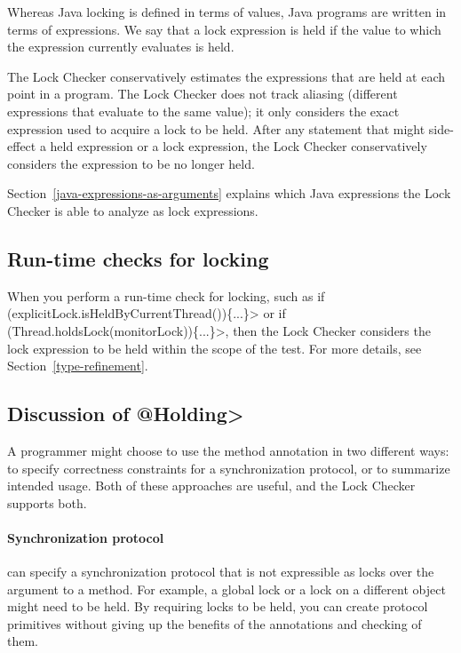 Whereas Java locking is defined in terms of values, Java programs are
written in terms of expressions.
We say that a lock expression is held if the value to which the expression
currently evaluates is held.

The Lock Checker conservatively estimates the expressions that are held at
each point in a program.
The Lock Checker does not track aliasing
(different expressions that evaluate to the same value); it only considers
the exact expression used to acquire a lock to be held.  After any statement
that might side-effect a held expression or a lock expression, the Lock
Checker conservatively considers the expression to be no longer held.

Section~\ref{java-expressions-as-arguments} explains which Java
expressions the Lock Checker is able to analyze as lock expressions.


\subsection{Run-time checks for locking\label{lock-runtime-checks}}

When you perform a run-time check for locking, such as
\<if (explicitLock.isHeldByCurrentThread())\{...\}> or
\<if (Thread.holdsLock(monitorLock))\{...\}>,
then the Lock Checker considers the lock expression to be held
within the scope of the test.  For more details, see
Section~\ref{type-refinement}.


\subsection{Discussion of \<@Holding>\label{lock-checker-holding}}

A programmer might choose to use the  method annotation in
two different ways:  to specify correctness constraints for a synchronization protocol, or to summarize
intended usage.  Both of these approaches are useful, and the Lock Checker
supports both.

\paragraph{Synchronization protocol\label{lock-checker-holding-synchronization-protocol}}

   can specify a synchronization protocol that
  is not expressible as locks over the argument to a method.  For example, a global lock
  or a lock on a different object might need to be held.  By requiring locks to be
  held, you can create protocol primitives without giving up
  the benefits of the annotations and checking of them.

